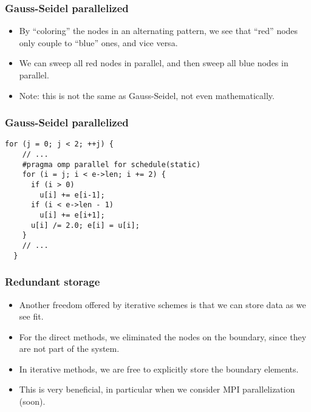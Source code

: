 \begin{frame}
  \frametitle{Gauss-Seidel parallelized}
  \begin{center}
  \end{center}
  \begin{itemize}
  \item By ``coloring'' the nodes in an alternating pattern, we see that ``red''
    nodes only couple to ``blue'' ones, and vice versa.
  \item We can sweep all red nodes in parallel, and then sweep all blue nodes in
    parallel.
  \item Note: this is not the same as Gauss-Seidel, not even mathematically.
  \end{itemize}
\end{frame}

\begin{frame}[fragile]
  \frametitle{Gauss-Seidel parallelized}
\begin{lstlisting}[style=c, basicstyle=\ttfamily\footnotesize]
  for (j = 0; j < 2; ++j) {
    // ...
    #pragma omp parallel for schedule(static)
    for (i = j; i < e->len; i += 2) {
      if (i > 0)
        u[i] += e[i-1];
      if (i < e->len - 1)
        u[i] += e[i+1];
      u[i] /= 2.0; e[i] = u[i];
    }
    // ...
  }
\end{lstlisting}
\end{frame}

\begin{frame}[fragile]
  \frametitle{Redundant storage}
  \begin{itemize}
  \item Another freedom offered by iterative schemes is that we can store data
    as we see fit.
  \item For the direct methods, we eliminated the nodes on the boundary, since
    they are not part of the system.
  \item In iterative methods, we are free to explicitly store the boundary
    elements.
  \item This is very beneficial, in particular when we consider MPI
    parallelization (soon).
  \end{itemize}
\end{frame}

